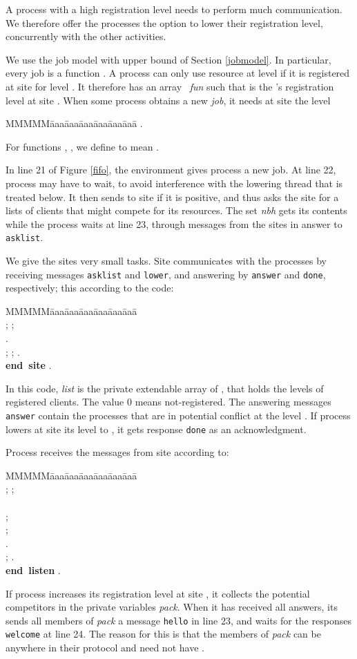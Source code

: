 \documentclass[10pt]{article} \usepackage[english]{babel}
\newenvironment{tab}{\begin{tabbing}
MMMMM\=aaa\=aaa\=aaa\=aaa\=aaa\=aaa\= \kill}{\end{tabbing}}
\def\S #1/{\mbox {\textsl{#1}}}
\def\B #1/{\mbox {\textbf{#1}}}
\def\T #1/{\mbox {\texttt{#1}}}
\begin{document}
A process with a high registration level needs to perform much
communication.  We therefore offer the processes the option to lower
their registration level, concurrently with the other activities.

We use the job model with upper bound  of Section \ref{jobmodel}.
In particular, every job is a function .  A
process can only use resource  at level  if it is registered at
site  for level .  It therefore has an array \S
fun/ such that  is the 's registration level at site
.  When some process obtains a new \S job/, it needs at site 
the level
\begin{tab}
\>  .
\end{tab}
For functions , , we define  to mean
.  

In line 21 of Figure \ref{fifo}, the environment gives process  a
new job.  At line 22, process  may have to wait, to avoid
interference with the lowering thread that is treated below.  It then
sends  to site  if it is positive, and thus asks the
site for a lists of clients that might compete for its resources.  The
set \S nbh/ gets its contents while the process waits at line 23,
through messages from the sites in answer to \T asklist/.

We give the sites very small tasks.  Site  communicates with the
processes by receiving messages \T asklist/ and \T lower/, and
answering by \T answer/ and \T done/, respectively; this
according to the code:
\begin{tab}
\>\+\+ \\
 \>  ;
  ;\\
\>  .\\
 \>  ;  ;
  .\-\\
\B end site/ .
\end{tab}
In this code, \S list/ is the private extendable array  of
, that holds the levels of registered clients.  The value 0 means
not-registered.  The answering messages \T answer/ contain the
processes that are in potential conflict at the level .  If process
 lowers at site  its level to , it gets response \T done/ as
an acknowledgment.

Process  receives the messages from site  according to:
\begin{tab}
\>\+\+  \\
 \>  ; 
  ;\\
\>  \\
\>\>   ;\\
\>\>  ;\\
\>  .\\
 \>  ; 
 .\-\\
\B end listen/ .
\end{tab}
If process  increases its registration level at site , it
collects the potential competitors in the private variables \S pack/.
When it has received all answers, its sends all members of \S pack/ a
message \T hello/ in line 23, and waits for the responses \T welcome/
at line 24.  The reason for this is that the members of \S pack/ can
be anywhere in their protocol and need not have .
\end{document}
